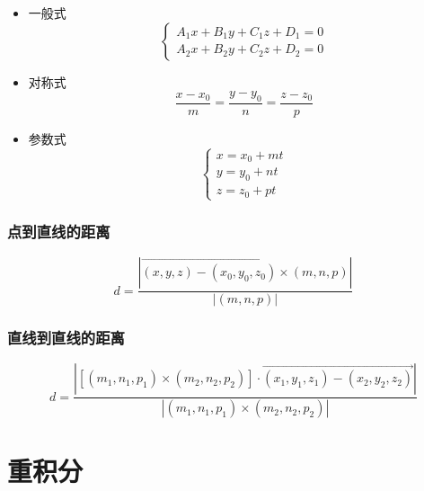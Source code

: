 \documentclass{article}
\begin{document}
\begin{itemize}
    \item 一般式 \begin{equation}
              \begin{cases}
                  A_1 x + B_1 y + C_1 z + D_1 = 0 \\
                  A_2 x + B_2 y + C_2 z + D_2 = 0
              \end{cases}
          \end{equation}
    \item 对称式 \begin{equation}
              \frac{x - x_0}{m} = \frac{y - y_0}{n} = \frac{z - z_0}{p}
          \end{equation}
    \item 参数式 \begin{equation}
              \begin{cases}
                  x = x_0 + m t \\
                  y = y_0 + n t \\
                  z = z_0 + p t
              \end{cases}
          \end{equation}
\end{itemize}

\subsubsection{点到直线的距离}

\begin{equation}
    d = \frac{\left|\overrightarrow{(x, y, z) - (x_0, y_0, z_0)} \times (m, n, p)\right|}{|(m, n, p)|}
\end{equation}

\subsubsection{直线到直线的距离}

\begin{equation}
    d = \frac{\left|\left[(m_1, n_1, p_1) \times (m_2, n_2, p_2) \right] \cdot \overrightarrow{(x_1, y_1, z_1) - (x_2, y_2, z_2)}\right|}{\left|(m_1, n_1, p_1) \times (m_2, n_2, p_2)\right|}
\end{equation}

\section{重积分}
\end{document}

